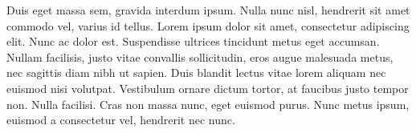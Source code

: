 Duis eget massa sem, gravida interdum ipsum. Nulla nunc nisl, hendrerit sit amet commodo vel, varius id tellus. Lorem ipsum dolor sit amet, consectetur adipiscing elit. Nunc ac dolor est. Suspendisse ultrices tincidunt metus eget accumsan. Nullam facilisis, justo vitae convallis sollicitudin, eros augue malesuada metus, nec sagittis diam nibh ut sapien. Duis blandit lectus vitae lorem aliquam nec euismod nisi volutpat. Vestibulum ornare dictum tortor, at faucibus justo tempor non. Nulla facilisi. Cras non massa nunc, eget euismod purus. Nunc metus ipsum, euismod a consectetur vel, hendrerit nec nunc.